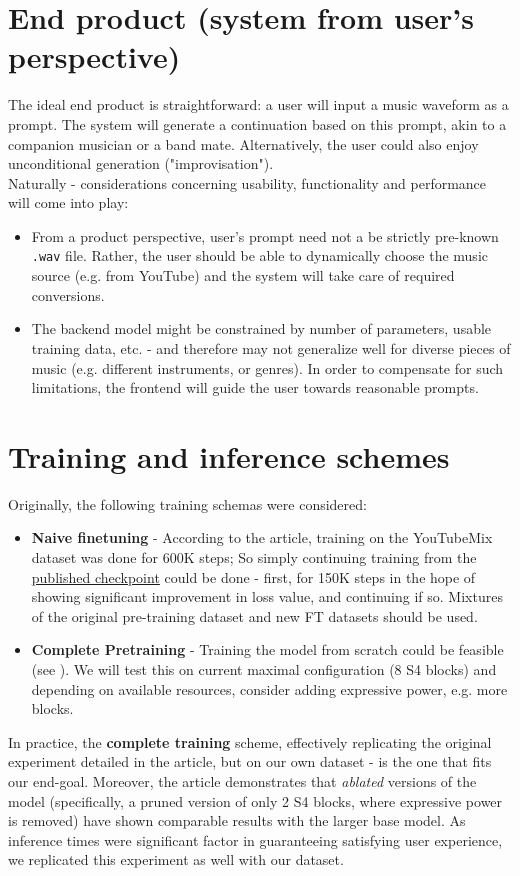 \documentclass[12pt]{article}
\begin{document}
\section{End product (system from user’s perspective)}
The ideal end product is straightforward: a user will input a music waveform as a prompt. The system will generate a continuation based on this prompt, akin to a companion musician or a band mate. Alternatively, the user could also enjoy unconditional generation ("improvisation").
\\
Naturally - considerations concerning usability, functionality and performance will come into play:
\begin{itemize}
    \item From a product perspective, user's prompt need not a be strictly pre-known \texttt{.wav} file. Rather, the user should be able to dynamically choose the music source (e.g. from YouTube) and the system will take care of required conversions.
    \item The backend model might be constrained by number of parameters, usable training data, etc. - and therefore may not generalize well for diverse pieces of music (e.g. different instruments, or genres). In order to compensate for such limitations, the frontend will guide the user towards reasonable prompts.
\end{itemize}
\section{Training and inference schemes}
Originally, the following training schemas were considered:
\begin{itemize}
    \item \textbf{Naive finetuning} - According to the article, training on the YouTubeMix dataset was done for 600K steps; So simply continuing training from the \href{https://huggingface.co/krandiash/sashimi-release}{published checkpoint} could be done - first, for 150K steps in the hope of showing significant improvement in loss value, and continuing if so. Mixtures of the original pre-training dataset and new FT datasets should be used.
    \item \textbf{Complete Pretraining} - Training the model from scratch could be feasible (see ). We will test this on current maximal configuration (8 S4 blocks) and depending on available resources, consider adding expressive power, e.g. more blocks.
\end{itemize}
In practice, the \textbf{complete training} scheme, effectively replicating the original experiment detailed in the article, but on our own dataset - is the one that fits our end-goal. Moreover, the article demonstrates that \textit{ablated} versions of the model (specifically, a pruned version of only 2 S4 blocks, where expressive power is removed) have shown comparable results with the larger base model. As inference times were significant factor in guaranteeing satisfying user experience, we replicated this experiment as well with our dataset.
\end{document}
